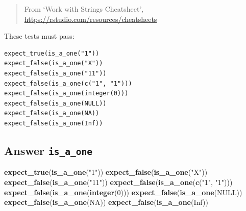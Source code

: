 \documentclass[]{book}
\newenvironment{Shaded}{}{}
\newcommand{\ControlFlowTok}[1]{\textcolor[rgb]{0.00,0.44,0.13}{\textbf{#1}}}
\newcommand{\DecValTok}[1]{\textcolor[rgb]{0.25,0.63,0.44}{#1}}
\newcommand{\KeywordTok}[1]{\textcolor[rgb]{0.00,0.44,0.13}{\textbf{#1}}}
\newcommand{\NormalTok}[1]{#1}
\newcommand{\OperatorTok}[1]{\textcolor[rgb]{0.40,0.40,0.40}{#1}}
\newcommand{\OtherTok}[1]{\textcolor[rgb]{0.00,0.44,0.13}{#1}}
\newcommand{\StringTok}[1]{\textcolor[rgb]{0.25,0.44,0.63}{#1}}
\begin{document}
\begin{quote}
From `Work with Strings Cheatsheet', \url{https://rstudio.com/resources/cheatsheets}
\end{quote}

These tests must pass:

\begin{verbatim}
expect_true(is_a_one("1"))
expect_false(is_a_one("X"))
expect_false(is_a_one("11"))
expect_false(is_a_one(c("1", "1")))
expect_false(is_a_one(integer(0)))
expect_false(is_a_one(NULL))
expect_false(is_a_one(NA))
expect_false(is_a_one(Inf))
\end{verbatim}

\hypertarget{answer-is_a_one}{%
\subsection{\texorpdfstring{Answer \texttt{is\_a\_one}}{Answer is\_a\_one}}\label{answer-is_a_one}}

\begin{Shaded}
\end{Shaded}

\begin{Shaded}
\begin{Highlighting}[]
\KeywordTok{expect_true}\NormalTok{(}\KeywordTok{is_a_one}\NormalTok{(}\StringTok{"1"}\NormalTok{))}
\KeywordTok{expect_false}\NormalTok{(}\KeywordTok{is_a_one}\NormalTok{(}\StringTok{"X"}\NormalTok{))}
\KeywordTok{expect_false}\NormalTok{(}\KeywordTok{is_a_one}\NormalTok{(}\StringTok{"11"}\NormalTok{))}
\KeywordTok{expect_false}\NormalTok{(}\KeywordTok{is_a_one}\NormalTok{(}\KeywordTok{c}\NormalTok{(}\StringTok{"1"}\NormalTok{, }\StringTok{"1"}\NormalTok{)))}
\KeywordTok{expect_false}\NormalTok{(}\KeywordTok{is_a_one}\NormalTok{(}\KeywordTok{integer}\NormalTok{(}\DecValTok{0}\NormalTok{)))}
\KeywordTok{expect_false}\NormalTok{(}\KeywordTok{is_a_one}\NormalTok{(}\OtherTok{NULL}\NormalTok{))}
\KeywordTok{expect_false}\NormalTok{(}\KeywordTok{is_a_one}\NormalTok{(}\OtherTok{NA}\NormalTok{))}
\KeywordTok{expect_false}\NormalTok{(}\KeywordTok{is_a_one}\NormalTok{(}\OtherTok{Inf}\NormalTok{))}
\end{Highlighting}
\end{Shaded}
\end{document}

